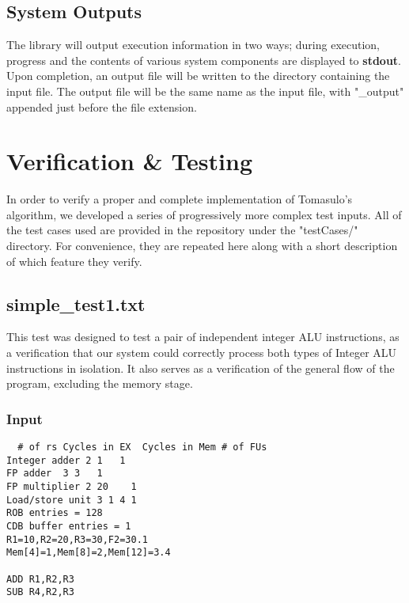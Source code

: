 \documentclass[12pt]{article}
\begin{document}
\subsection{System Outputs}
The library will output execution information in two ways; during execution, progress and the contents of various system components are displayed to \textbf{stdout}.  Upon completion, an output file will be written to the directory containing the input file.  The output file will be the same name as the input file, with "\_output" appended just before the file extension.

\section{Verification \& Testing}
In order to verify a proper and complete implementation of Tomasulo's algorithm, we developed a series of progressively more complex test inputs.  All of the test cases used are provided in the repository under the "testCases/" directory.  For convenience, they are repeated here along with a short description of which feature they verify.

\subsection{simple\_test1.txt}
This test was designed to test a pair of independent integer ALU instructions, as a verification that our system could correctly process both types of Integer ALU instructions in isolation.  It also serves as a verification of the general flow of the program, excluding the memory stage.

\subsubsection*{Input}
\begin{verbatim}
  # of rs Cycles in EX  Cycles in Mem # of FUs
Integer adder 2 1   1
FP adder  3 3   1
FP multiplier 2 20    1
Load/store unit 3 1 4 1
ROB entries = 128
CDB buffer entries = 1
R1=10,R2=20,R3=30,F2=30.1
Mem[4]=1,Mem[8]=2,Mem[12]=3.4

ADD R1,R2,R3
SUB R4,R2,R3
\end{verbatim}
\end{document}
